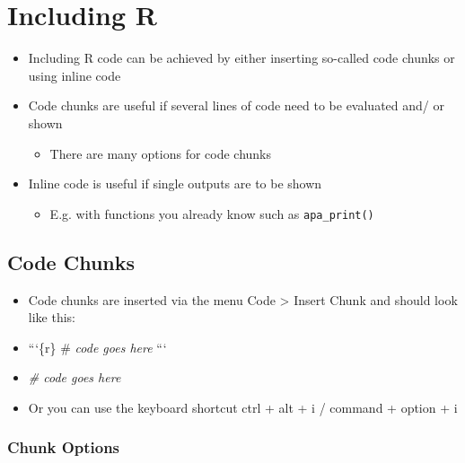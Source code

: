 \documentclass[
]{book}
\newenvironment{Shaded}{\begin{snugshade}}{\end{snugshade}}
\newcommand{\CommentTok}[1]{\textcolor[rgb]{0.56,0.35,0.01}{\textit{#1}}}
\providecommand{\tightlist}{%
  \setlength{\itemsep}{0pt}\setlength{\parskip}{0pt}}
\begin{document}
\section{Including R}\label{including-r}

\begin{itemize}
\tightlist
\item
  Including R code can be achieved by either inserting so-called code chunks or using inline code
\item
  Code chunks are useful if several lines of code need to be evaluated and/ or shown

  \begin{itemize}
  \tightlist
  \item
    There are many options for code chunks
  \end{itemize}
\item
  Inline code is useful if single outputs are to be shown

  \begin{itemize}
  \tightlist
  \item
    E.g. with functions you already know such as \texttt{apa\_print()}
  \end{itemize}
\end{itemize}

\subsection{Code Chunks}\label{code-chunks}

\begin{itemize}
\item
  Code chunks are inserted via the menu Code \textgreater{} Insert Chunk and should look like this:
\item
  ```\{r\}
  \# \emph{code goes here}
  ```
\item
\begin{Shaded}
\begin{Highlighting}[]
\CommentTok{\# code goes here}
\end{Highlighting}
\end{Shaded}
\item
  Or you can use the keyboard shortcut ctrl + alt + i / command + option + i
\end{itemize}

\subsubsection*{Chunk Options}\label{chunk-options}
\end{document}
